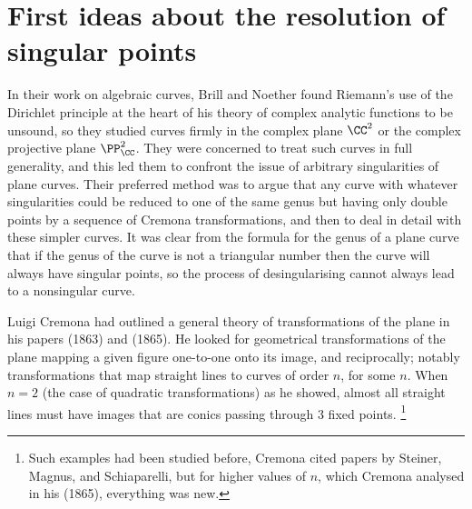 \section{First ideas about the resolution of singular points}
In their work on algebraic curves, Brill and Noether found Riemann's use
of the Dirichlet principle at the heart of his theory of complex analytic
functions to be unsound, so they studied curves firmly in the complex
plane $\CC^2$ or the complex projective plane $\PP_{\CC}^2$. They were
concerned to treat such curves in full generality, and this led them
to confront the issue of arbitrary singularities of plane curves. Their
preferred method was to argue that any curve with whatever singularities
could be reduced to one of the same genus but having only double points
by a sequence of Cremona transformations, and then to deal in detail
with these simpler curves. It was clear from the formula for the genus
of a plane curve that if the genus of the curve is not a triangular
number then the curve will always have singular points, so the process
of desingularising cannot always lead to a nonsingular curve.

Luigi Cremona had  outlined a general theory of transformations of
the plane in his papers (1863) and (1865). He looked for geometrical
transformations of the plane mapping a given figure one-to-one onto its
image, and reciprocally; notably  transformations that map straight lines
to curves of order $n$, for some $n$. When $n=2$ (the case of quadratic
transformations)  as he showed, almost all straight lines must have
images that are conics passing through 3 fixed points.%
%
\footnote{Such
examples had been studied before, Cremona  cited papers by Steiner,
Magnus, and Schiaparelli, but for higher values of $n$, which Cremona
analysed in his (1865), everything was new.}



